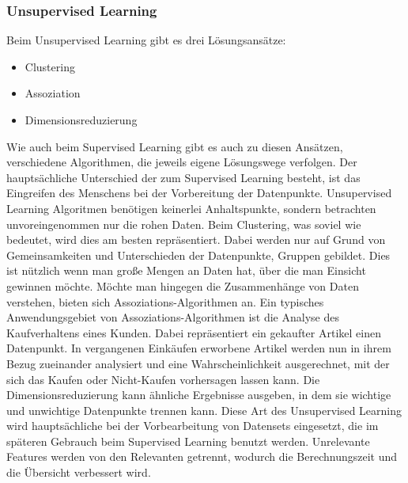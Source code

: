 \documentclass[12pt,german,ngerman]{report}
\begin{document}
        \subsubsection{Unsupervised Learning}
            Beim Unsupervised Learning gibt es drei Lösungsansätze\cite{unsupervisedlearning2021ibm}:
            \begin{itemize}
                \item{Clustering}
                \item{Assoziation}
                \item{Dimensionsreduzierung}
            \end{itemize}
            Wie auch beim Supervised Learning gibt es auch zu diesen Ansätzen, verschiedene
            Algorithmen, die jeweils eigene Lösungswege verfolgen.
            Der hauptsächliche Unterschied der zum Supervised Learning besteht, ist das Eingreifen
            des Menschens bei der Vorbereitung der Datenpunkte. Unsupervised Learning Algoritmen
            benötigen keinerlei Anhaltspunkte, sondern betrachten unvoreingenommen  nur die rohen Daten.
            Beim Clustering, was soviel wie  bedeutet, wird dies am besten repräsentiert.
            Dabei werden nur auf Grund von Gemeinsamkeiten und Unterschieden der Datenpunkte, Gruppen gebildet.\cite{clustering2021elementai}
            Dies ist nützlich wenn man große Mengen an Daten hat, über die man Einsicht gewinnen möchte.
            Möchte man hingegen die Zusammenhänge von Daten verstehen, 
            bieten sich Assoziations-Algorithmen an.\cite{apriori2019sciencedata}
            Ein typisches Anwendungsgebiet von Assoziations-Algorithmen ist die Analyse des Kaufverhaltens eines Kunden.
            Dabei repräsentiert ein gekaufter Artikel einen Datenpunkt. 
            In vergangenen Einkäufen erworbene Artikel werden nun 
            in ihrem Bezug zueinander analysiert und eine Wahrscheinlichkeit ausgerechnet, mit der sich
            das Kaufen oder Nicht-Kaufen vorhersagen lassen kann. Die Dimensionsreduzierung kann
            ähnliche Ergebnisse ausgeben, in dem sie wichtige und unwichtige Datenpunkte trennen kann.
            Diese Art des Unsupervised Learning wird hauptsächliche bei der Vorbearbeitung von Datensets eingesetzt,
            die im späteren Gebrauch beim Supervised Learning benutzt werden.\cite{unsupervisedlearning2021ibm}
            Unrelevante Features werden von den Relevanten getrennt, wodurch die Berechnungszeit und die Übersicht
            verbessert wird.
            
\end{document}
